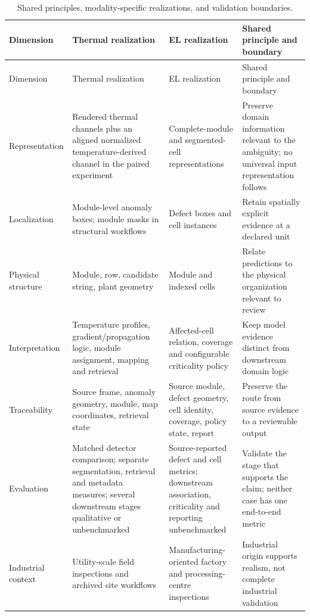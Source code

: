 \documentclass[12pt,a4paper]{report}
\begin{document}
\begin{longtable}{p{2.5cm} p{3.3cm} p{3.3cm} p{3.7cm}}
\caption{Shared principles, modality-specific realizations, and validation boundaries.}\label{tab:ch07-common-specific}\\
\toprule
Dimension & Thermal realization & EL realization & Shared principle and boundary \\
\midrule
\endfirsthead
\toprule
Dimension & Thermal realization & EL realization & Shared principle and boundary \\
\midrule
\endhead
Representation & Rendered thermal channels plus an aligned normalized temperature-derived channel in the paired experiment & Complete-module and segmented-cell representations & Preserve domain information relevant to the ambiguity; no universal input representation follows \\
Localization & Module-level anomaly boxes; module masks in structural workflows & Defect boxes and cell instances & Retain spatially explicit evidence at a declared unit \\
Physical structure & Module, row, candidate string, plant geometry & Module and indexed cells & Relate predictions to the physical organization relevant to review \\
Interpretation & Temperature profiles, gradient/propagation logic, module assignment, mapping and retrieval & Affected-cell relation, coverage and configurable criticality policy & Keep model evidence distinct from downstream domain logic \\
Traceability & Source frame, anomaly geometry, module, map coordinates, retrieval state & Source module, defect geometry, cell identity, coverage, policy state, report & Preserve the route from source evidence to a reviewable output \\
Evaluation & Matched detector comparison; separate segmentation, retrieval and metadata measures; several downstream stages qualitative or unbenchmarked & Source-reported defect and cell metrics; downstream association, criticality and reporting unbenchmarked & Validate the stage that supports the claim; neither case has one end-to-end metric \\
Industrial context & Utility-scale field inspections and archived site workflows & Manufacturing-oriented factory and processing-centre inspections & Industrial origin supports realism, not complete industrial validation \\
\bottomrule
\end{longtable}
\end{document}
